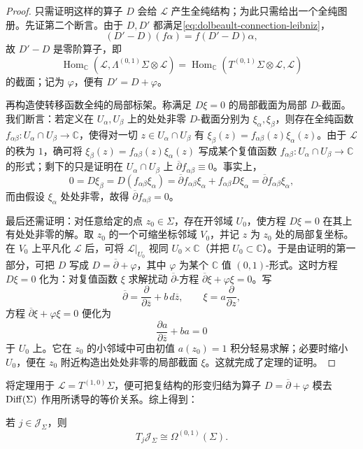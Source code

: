 \begin{proof}
只需证明这样的算子 $D$ 会给 $\mathcal L$ 产生全纯结构；为此只需给出一个全纯图册。先证第二个断言。由于 $D,D'$ 都满足\eqref{eq:dolbeault-connection-leibniz}，
\[
 (D'-D)(f\alpha)=f(D'-D)\alpha,
\]
故 $D'-D$ 是零阶算子，即
\[
 \operatorname{Hom}_{\mathbb C}(\mathcal L,
 \Lambda^{(0,1)}\Sigma\otimes\mathcal L)
 =\operatorname{Hom}_{\mathbb C}(T^{(0,1)}\Sigma\otimes\mathcal L,
 \mathcal L)
\]
的截面；记为 $\varphi$，便有 $D'=D+\varphi$。

再构造使转移函数全纯的局部标架。称满足 $D\xi=0$ 的局部截面为局部 $D$-截面。我们断言：若定义在 $U_\alpha,U_\beta$ 上的处处非零 $D$-截面分别为 $\xi_\alpha,\xi_\beta$，则存在全纯函数
$f_{\alpha\beta}:U_\alpha\cap U_\beta\to\mathbb C$，使得对一切
$z\in U_\alpha\cap U_\beta$ 有 $\xi_\beta(z)=f_{\alpha\beta}(z)\xi_\alpha(z)$。由于 $\mathcal L$ 的秩为 $1$，确可将
$\xi_\beta(z)=f_{\alpha\beta}(z)\xi_\alpha(z)$ 写成某个复值函数
$f_{\alpha\beta}:U_\alpha\cap U_\beta\to\mathbb C$ 的形式；剩下的只是证明在
$U_\alpha\cap U_\beta$ 上 $\overline\partial f_{\alpha\beta}\equiv0$。事实上，
\[
 0=D\xi_\beta=D(f_{\alpha\beta}\xi_\alpha)
 =\overline\partial f_{\alpha\beta}\xi_\alpha
 +f_{\alpha\beta}D\xi_\alpha
 =\overline\partial f_{\alpha\beta}\xi_\alpha,
\]
而由假设 $\xi_\alpha$ 处处非零，故得 $\overline\partial f_{\alpha\beta}=0$。

最后还需证明：对任意给定的点 $z_0\in\Sigma$，存在开邻域 $U_0$，使方程
$D\xi=0$ 在其上有处处非零的解。取 $z_0$ 的一个可缩坐标邻域 $V_0$，并记
$z$ 为 $z_0$ 处的局部复坐标。在 $V_0$ 上平凡化 $\mathcal L$ 后，可将
$\mathcal L|_{U_0}$ 视同 $U_0\times\mathbb C$（并把 $U_0\subset\mathbb C$）。于是由证明的第一部分，可把 $D$ 写成
$D=\overline\partial+\varphi$，其中 $\varphi$ 为某个 $\mathbb C$ 值 $(0,1)$-形式。这时方程 $D\xi=0$ 化为：对复值函数 $\xi$ 求解扰动
$\overline\partial$-方程 $\overline\partial\xi+\varphi\xi=0$。写
\[
 \overline\partial=\frac{\partial}{\partial\overline z}+b\,d\overline z,
 \qquad
 \xi=a\frac\partial{\partial z},
\]
方程 $\overline\partial\xi+\varphi\xi=0$ 便化为
\[
 \frac{\partial a}{\partial\overline z}+ba=0
\]
于 $U_0$ 上。它在 $z_0$ 的小邻域中可由初值 $a(z_0)=1$ 积分轻易求解；必要时缩小
$U_0$，便在 $z_0$ 附近构造出处处非零的局部截面 $\xi$。这就完成了定理的证明。
\end{proof}

将定理用于 $\mathcal L=T^{(1,0)}\Sigma$，便可把复结构的形变归结为算子
$D=\overline\partial+\varphi$ 模去 $\operatorname{Diff}(\Sigma)$ 作用所诱导的等价关系。综上得到：

\begin{lemma}\label{lem:tangent-complex-structures}
若 $j\in\mathcal J_\Sigma$，则
\[
 T_j\mathcal J_\Sigma\cong\Omega^{(0,1)}(\Sigma).
\]
\end{lemma}

